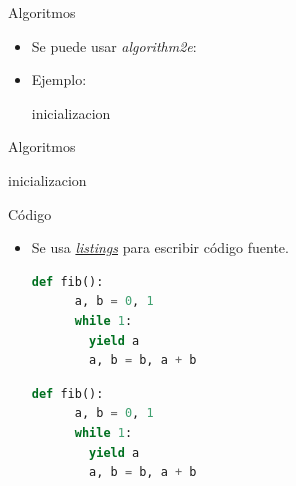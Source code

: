 \begin{frame}[fragile]{Algoritmos}
  \begin{itemize}
    \item Se puede usar \emph{algorithm2e}:
    \item Ejemplo:
          \begin{latexexample}
            \begin{algorithm}[H]
              \caption{Como escribir algoritmos}
              inicializacion\;
            \end{algorithm}
          \end{latexexample}
  \end{itemize}
\end{frame}
\begin{frame}[fragile]{Algoritmos}
          \begin{latexcode}
            \begin{algorithm}[H]
              \caption{Como escribir algoritmos}
              inicializacion\;
            \end{algorithm}
          \end{latexcode}
\end{frame}

\begin{frame}[fragile]{Código}
  \begin{itemize}
    \item Se usa \href{http://texdoc.net/texmf-dist/doc/latex/listings/listings.pdf}{\emph{listings}} para escribir código fuente.
        \begin{latexexample}
    \begin{lstlisting}[language=Python]
    def fib():
      a, b = 0, 1
      while 1:
        yield a
        a, b = b, a + b
    \end{lstlisting}
        \end{latexexample}
        \begin{latexcode}
            
    \begin{lstlisting}[language=Python]
    def fib():
      a, b = 0, 1
      while 1:
        yield a
        a, b = b, a + b
    \end{lstlisting}
        \end{latexcode}
  \end{itemize}
\end{frame}

